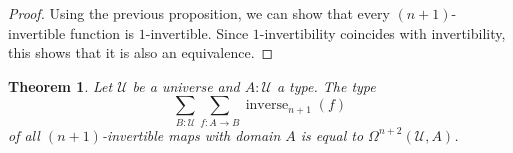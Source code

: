 \documentclass{article}
\theoremstyle{plain}
\newtheorem{theorem}{Theorem}
\theoremstyle{definition}
\theoremstyle{remark}
\newcommand{\U}{\mathcal{U}}
\newcommand{\lspace}[1]{\Omega^{#1}}
\DeclareMathOperator{\inverse}{inverse}
\begin{document}
\begin{proof}
  Using the previous proposition, we can show that every \((n + 1)\)-invertible function is
  \(1\)-invertible. Since \(1\)-invertibility coincides with invertibility, this shows that
  it is also an equivalence.
\end{proof}

\begin{theorem}
  Let \(\U\) be a universe and \(A : \U\) a type. The type
  \[\sum_{B : \U}\sum_{f : A \to B}\inverse_{n + 1}(f)\] of all \((n + 1)\)-invertible maps
  with domain \(A\) is equal to
  \(\lspace{n + 2}(\U, A)\).
\end{theorem}
\end{document}
